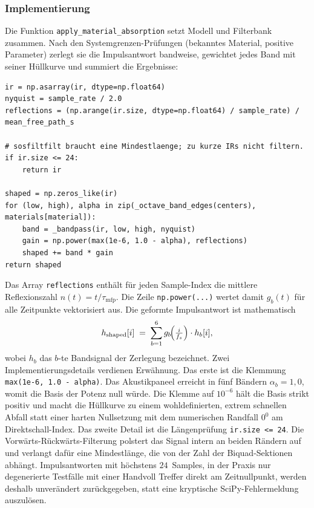 \subsubsection{Implementierung}
\label{subsubsec:material-implementierung}

Die Funktion \texttt{apply\_material\_absorption} setzt Modell und Filterbank
zusammen. Nach den Systemgrenzen-Prüfungen (bekanntes Material, positive
Parameter) zerlegt sie die Impulsantwort bandweise, gewichtet jedes Band mit
seiner Hüllkurve und summiert die Ergebnisse:

\begin{lstlisting}[style=cemdsp, caption={Kern von \texttt{apply\_material\_absorption}.}, label={lst:material}]
ir = np.asarray(ir, dtype=np.float64)
nyquist = sample_rate / 2.0
reflections = (np.arange(ir.size, dtype=np.float64) / sample_rate) / mean_free_path_s

# sosfiltfilt braucht eine Mindestlaenge; zu kurze IRs nicht filtern.
if ir.size <= 24:
    return ir

shaped = np.zeros_like(ir)
for (low, high), alpha in zip(_octave_band_edges(centers), materials[material]):
    band = _bandpass(ir, low, high, nyquist)
    gain = np.power(max(1e-6, 1.0 - alpha), reflections)
    shaped += band * gain
return shaped
\end{lstlisting}

Das Array \texttt{reflections} enthält für jeden Sample-Index die mittlere
Reflexionszahl $n(t) = t / \tau_{\mathrm{mfp}}$. Die Zeile \texttt{np.power(...)}
wertet damit $g_b(t)$ für alle Zeitpunkte vektorisiert aus. Die geformte
Impulsantwort ist mathematisch
\[
    h_{\text{shaped}}[i]
    \;=\; \sum_{b=1}^{6} g_b\!\Bigl(\tfrac{i}{f_s}\Bigr) \cdot h_b[i],
\]
wobei $h_b$ das $b$-te Bandsignal der Zerlegung bezeichnet. Zwei
Implementierungsdetails verdienen Erwähnung. Das erste ist die Klemmung
\texttt{max(1e-6, 1.0 - alpha)}. Das Akustikpaneel erreicht in fünf Bändern
$\alpha_b = 1{,}0$, womit die Basis der Potenz null würde. Die Klemme auf
$10^{-6}$ hält die Basis strikt positiv und macht die Hüllkurve zu einem
wohldefinierten, extrem schnellen Abfall statt einer harten Nullsetzung mit dem
numerischen Randfall $0^0$ am Direktschall-Index. Das zweite Detail ist die
Längenprüfung \texttt{ir.size <= 24}. Die Vorwärts-Rückwärts-Filterung polstert
das Signal intern an beiden Rändern auf und verlangt dafür eine Mindestlänge, die
von der Zahl der Biquad-Sektionen abhängt. Impulsantworten mit höchstens
$24$~Samples, in der Praxis nur degenerierte Testfälle mit einer Handvoll Treffer
direkt am Zeitnullpunkt, werden deshalb unverändert zurückgegeben, statt eine
kryptische SciPy-Fehlermeldung auszulösen.

